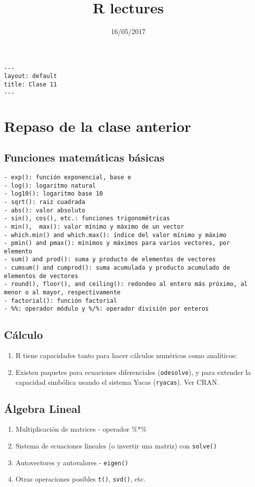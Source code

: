 \documentclass[11pt]{article}
\date{16/05/2017}
\title{R lectures}
\begin{document}
\maketitle
\begin{verbatim}
--- 
layout: default 
title: Clase 11
--- 
\end{verbatim}
\section*{Repaso de la clase anterior}
\label{sec:org2bb1966}
\subsection*{Funciones matemáticas básicas}
\label{sec:org3f9ae73}
\begin{verbatim}
- exp(): función exponencial, base e
- log(): logaritmo natural 
- log10(): logaritmo base 10
- sqrt(): raiz cuadrada
- abs(): valor absoluto
- sin(), cos(), etc.: funciones trigonométricas
- min(),  max(): valor mínimo y máximo de un vector
- which.min() and which.max(): índice del valor mínimo y máximo 
- pmin() and pmax(): mínimos y máximos para varios vectores, por elemento
- sum() and prod(): suma y producto de elementos de vectores
- cumsum() and cumprod(): suma acumulada y producto acumulado de elementos de vectores
- round(), floor(), and ceiling(): redondeo al entero más próximo, al menor o al mayor, respectivamente
- factorial(): función factorial
- %%: operador módulo y %/%: operador división por enteros
\end{verbatim}
\subsection*{Cálculo}
\label{sec:org8ffdd30}
\begin{enumerate}
\item R tiene capacidades tanto para hacer cálculos numéricos como analíticos:
\item Existen paquetes para ecuaciones diferenciales (\texttt{odesolve}), y para extender la capacidad simbólica usando el sistema Yacas (\texttt{ryacas}). Ver CRAN.
\end{enumerate}
\subsection*{Álgebra Lineal}
\label{sec:org4589db8}
\begin{enumerate}
\item Multiplicación de matrices - operador \%*\%
\item Sistema de ecuaciones lineales (o invertir una matriz) con \texttt{solve()}
\item Autovectores y autovalores - \texttt{eigen()}
\item Otras operaciones posibles \texttt{t()}, \texttt{svd()}, etc.
\end{enumerate}
\end{document}
